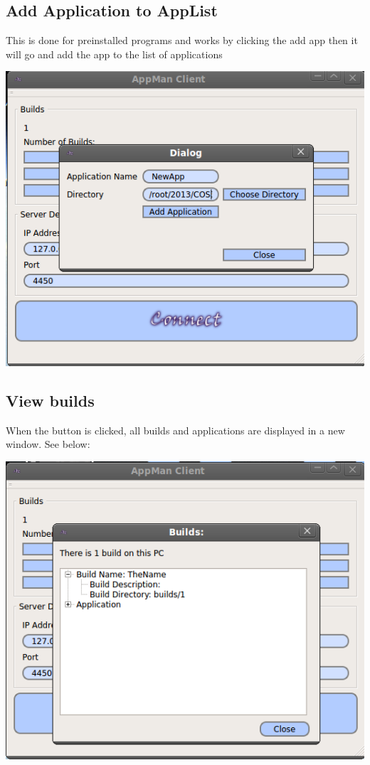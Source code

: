 \documentclass[a4paper,12pt,final]{article}
\begin{document}
\subsection{Add Application to AppList}
This is done for preinstalled programs and works by clicking the add app then it will go and add the app to the list of applications

\begin{center}
  	\includegraphics[scale=0.4]{AddAppToList.png}
 \end{center}
 
\subsection{View builds}
When the button is clicked, all builds and applications are displayed in a new window. See below:


\begin{center}
  	\includegraphics[scale=0.4]{SlaveBuilds.png}
 \end{center}
\end{document}
